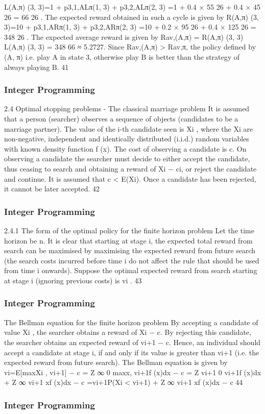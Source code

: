 \begin{frame}
L(A,π)
(3, 3)=1 + p3,1,ALπ(1, 3) + p3,2,ALπ(2, 3)
=1 + 0.4 ×
55
26
+ 0.4 ×
45
26
=
66
26
.
The expected reward obtained in such a cycle is given by
R(A,π)
(3, 3)=10 + p3,1,ARπ(1, 3) + p3,2,ARπ(2, 3)
=10 + 0.2 ×
95
26
+ 0.4 ×
125
26
=
348
26
.
The expected average reward is given by
Rav,(A,π) =
R(A,π)
(3, 3)
L(A,π)
(3, 3) =
348
66
≈ 5.2727.
Since Rav,(A,π) > Rav,π, the policy defined by (A, π) i.e. play A in
state 3, otherwise play B is better than the strategy of always
playing B.
41 \end{frame}  \begin{frame} \frametitle{Integer Programming}     
2.4 Optimal stopping problems - The classical marriage
problem
It is assumed that a person (searcher) observes a sequence of
objects (candidates to be a marriage partner).
The value of the i-th candidate seen is Xi
, where the Xi are
non-negative, independent and identically distributed (i.i.d.)
random variables with known density function f (x).
The cost of observing a candidate is c. On observing a candidate
the searcher must decide to either accept the candidate, thus
ceasing to search and obtaining a reward of Xi − ci, or reject the
candidate and continue. It is assumed that c < E(Xi).
Once a candidate has been rejected, it cannot be later accepted.
42 \end{frame}  \begin{frame} \frametitle{Integer Programming}     
2.4.1 The form of the optimal policy for the finite horizon
problem
Let the time horizon be n.
It is clear that starting at stage i, the expected total reward from
search can be maximised by maximising the expected reward from
future search (the search costs incurred before time i do not affect
the rule that should be used from time i onwards).
Suppose the optimal expected reward from search starting at stage
i (ignoring previous costs) is vi
.
43 \end{frame}  \begin{frame} \frametitle{Integer Programming}     
The Bellman equation for the finite horizon problem
By accepting a candidate of value Xi
, the searcher obtains a
reward of Xi − c. By rejecting this candidate, the searcher obtains
an expected reward of vi+1 − c.
Hence, an individual should accept a candidate at stage i, if and
only if its value is greater than vi+1 (i.e. the expected reward from
future search).
The Bellman equation is given by
vi=E[max{Xi
, vi+1}] − c =
Z ∞
0
max{x, vi+1}f (x)dx − c
=
Z vi+1
0
vi+1f (x)dx +
Z ∞
vi+1
xf (x)dx − c
=vi+1P(Xi < vi+1) + Z ∞
vi+1
xf (x)dx − c
44 \end{frame}  \begin{frame} \frametitle{Integer Programming}     

\end{frame}
